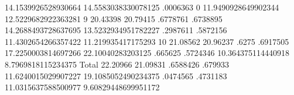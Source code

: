           {\VBAR} 14.1539926528930664  14.5583038330078125
          {\VBAR}            .0006363                    0
          {\VBAR} 11.9490928649902344  12.5229682922363281
          {\VBAR} 
        9 {\VBAR}            20.43398             20.79415
          {\VBAR}            .6778761             .6738895
          {\VBAR} 14.2688493728637695  13.5232934951782227
          {\VBAR}            .2987611             .5872156
          {\VBAR} 11.4302654266357422   11.219935417175293
          {\VBAR} 
       10 {\VBAR}            21.08562             20.96237
          {\VBAR}               .6275             .6917505
          {\VBAR} 17.2250003814697266    22.10040283203125
          {\VBAR}             .665625             .5724346
          {\VBAR}  10.364375114440918   8.7969818115234375
          {\VBAR} 
    Total {\VBAR}            22.20966             21.09831
          {\VBAR}            .6588426              .679933
          {\VBAR} 11.6240015029907227  19.1085052490234375
          {\VBAR}            .0474565             .4731183
          {\VBAR} 11.0315637588500977  9.60829448699951172
{\smallskip}
